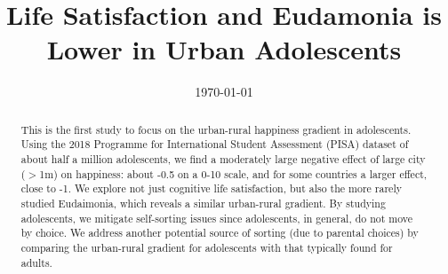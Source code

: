 \documentclass[11pt, letterpaper]{article}
\date{{}\today \hspace{.2in}\xxivtime}
\title{  %
Life Satisfaction and Eudamonia is Lower in Urban Adolescents
}
\author{
}
\begin{document}


\maketitle
\vspace{-.4in}
\begin{center}

\end{center}


\begin{abstract}
  \noindent This is the first study to focus on the urban-rural happiness gradient
  in adolescents. Using the 2018 Programme for International Student Assessment
  (PISA) dataset of about half a million adolescents, we  find a moderately large negative effect of large city ($>$1m) on
  happiness: about -0.5 on a 0-10 scale, and for some countries a larger effect, close to -1.   %
  We explore not just cognitive life satisfaction, but also the more rarely studied
  Eudaimonia, which reveals a similar urban-rural gradient. By studying
  adolescents, we mitigate self-sorting issues since adolescents, in general, do
  not move by choice. 
  We address another potential source of sorting (due to parental choices) by
  comparing the urban-rural gradient for adolescents with that typically found
  for adults.
\end{abstract}
\vspace{.15in} 
\vspace{.25in} 
\end{document}
